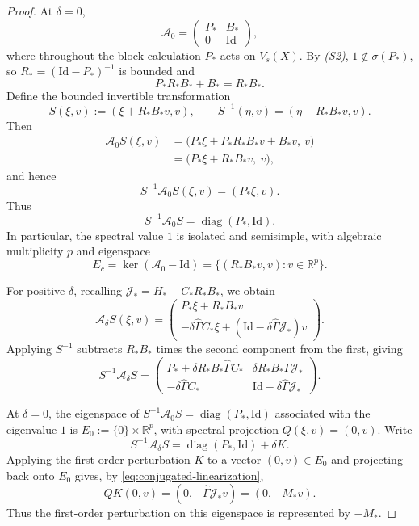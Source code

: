 \documentclass[11pt]{article}
\theoremstyle{definition}
\theoremstyle{remark}
\newcommand{\Id}{\mathrm{Id}}
\newcommand{\R}{\mathbb{R}}
\newcommand{\Gammahat}{\widehat{\Gamma}}
\begin{document}
\begin{proof}
At $\delta=0$,
\[
  \mathcal A_0=
  \begin{pmatrix}
    P_* & B_*\\
    0 & \Id
  \end{pmatrix},
\]
where throughout the block calculation $P_*$ acts on
$V_s(X)$.
By \emph{(S2)}, $1\notin\sigma(P_*)$, so
$R_*=(\Id-P_*)^{-1}$ is bounded and
\[
  P_*R_*B_*+B_*=R_*B_*.
\]
Define the bounded invertible transformation
\[
  S(\xi,v):=(\xi+R_*B_*v,v),
  \qquad
  S^{-1}(\eta,v)=(\eta-R_*B_*v,v).
\]
Then
\[
\begin{aligned}
  \mathcal A_0S(\xi,v)
  &=\bigl(P_*\xi+P_*R_*B_*v+B_*v,\ v\bigr)\\
  &=\bigl(P_*\xi+R_*B_*v,\ v\bigr),
\end{aligned}
\]
and hence
\[
  S^{-1}\mathcal A_0S(\xi,v)=(P_*\xi,v).
\]
Thus
\[
  S^{-1}\mathcal A_0S
  =\operatorname{diag}(P_*,\Id).
\]
In particular, the spectral value $1$ is isolated and
semisimple, with algebraic multiplicity $p$ and eigenspace
\[
  E_c=\ker(\mathcal A_0-\Id)
     =\{(R_*B_*v,v):v\in\R^p\}.
\]

For positive $\delta$, recalling
$\mathcal J_*=H_*+C_*R_*B_*$, we obtain
\[
  \mathcal A_\delta S(\xi,v)
  =
  \begin{pmatrix}
    P_*\xi+R_*B_*v\\
    -\delta\Gammahat C_*\xi
    +(\Id-\delta\Gammahat\mathcal J_*)v
  \end{pmatrix}.
\]
Applying $S^{-1}$ subtracts $R_*B_*$ times the second
component from the first, giving
\begin{equation}
  S^{-1}\mathcal A_\delta S
  =
  \begin{pmatrix}
    P_*+\delta R_*B_*\Gammahat C_*
      & \delta R_*B_*\Gammahat\mathcal J_*\\[1mm]
    -\delta\Gammahat C_*
      & \Id-\delta\Gammahat\mathcal J_*
  \end{pmatrix}.
  \label{eq:conjugated-linearization}
\end{equation}

At $\delta=0$, the eigenspace of
$S^{-1}\mathcal A_0S=\operatorname{diag}(P_*,\Id)$
associated with the eigenvalue $1$ is
$E_0:=\{0\}\times\R^p$, with spectral projection
$Q(\xi,v)=(0,v)$.
Write
\[
  S^{-1}\mathcal A_\delta S
  =
  \operatorname{diag}(P_*,\Id)+\delta K.
\]
Applying the first-order perturbation $K$ to a vector
$(0,v)\in E_0$ and projecting back onto $E_0$ gives,
by \eqref{eq:conjugated-linearization},
\[
  QK(0,v)
  =
  (0,-\Gammahat\mathcal J_*v)
  =
  (0,-M_*v).
\]
Thus the first-order perturbation on this eigenspace
is represented by $-M_*$.


\end{proof}
\end{document}
